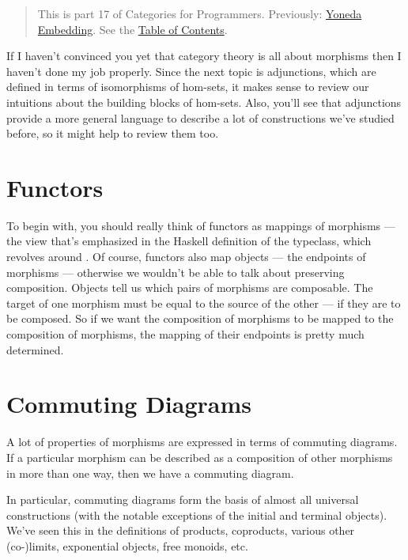 \begin{quote}
This is part 17 of Categories for Programmers. Previously:
\href{https://bartoszmilewski.com/2015/10/28/yoneda-embedding/}{Yoneda
Embedding}. See the
\href{https://bartoszmilewski.com/2014/10/28/category-theory-for-programmers-the-preface/}{Table
of Contents}.
\end{quote}

If I haven't convinced you yet that category theory is all about
morphisms then I haven't done my job properly. Since the next topic is
adjunctions, which are defined in terms of isomorphisms of hom-sets, it
makes sense to review our intuitions about the building blocks of
hom-sets. Also, you'll see that adjunctions provide a more general
language to describe a lot of constructions we've studied before, so it
might help to review them too.

\section{Functors}\label{functors}

To begin with, you should really think of functors as mappings of
morphisms --- the view that's emphasized in the Haskell definition of
the  typeclass, which revolves around . Of
course, functors also map objects --- the endpoints of morphisms ---
otherwise we wouldn't be able to talk about preserving composition.
Objects tell us which pairs of morphisms are composable. The target of
one morphism must be equal to the source of the other --- if they are to
be composed. So if we want the composition of morphisms to be mapped to
the composition of  morphisms, the mapping of their
endpoints is pretty much determined.

\section{Commuting Diagrams}\label{commuting-diagrams}

A lot of properties of morphisms are expressed in terms of commuting
diagrams. If a particular morphism can be described as a composition of
other morphisms in more than one way, then we have a commuting diagram.

In particular, commuting diagrams form the basis of almost all universal
constructions (with the notable exceptions of the initial and terminal
objects). We've seen this in the definitions of products, coproducts,
various other (co-)limits, exponential objects, free monoids, etc.

